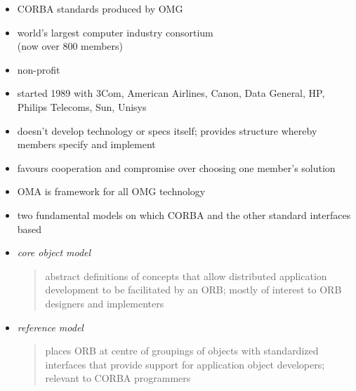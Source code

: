 \documentclass{sepslide-soa-faked} %
\begin{document}
\begin{slide}
\begin{itemize}
\item CORBA standards produced by OMG
\item world's largest computer industry consortium \\
  (now over 800 members)
\item non-profit
\item started 1989 with 3Com, American Airlines, Canon, Data General, HP,
Philips Telecoms, Sun, Unisys
\item doesn't develop technology or specs itself; provides structure
whereby members specify and implement
\item favours cooperation and compromise over choosing one member's solution
\end{itemize}
\end{slide}

\begin{slide}
\begin{itemize}
\item OMA is framework for all OMG technology
\item two fundamental models on which CORBA and the other standard
interfaces based
\item \emph{core object model}
  \begin{quote}
  abstract definitions of concepts that allow distributed application
  development to be facilitated by an ORB; 
  mostly of interest to ORB designers and implementers
  \end{quote}
\item \emph{reference model}
  \begin{quote}
  places ORB at centre of groupings of objects with standardized interfaces
  that provide support for application object developers;
  relevant to CORBA programmers
  \end{quote}
\end{itemize}
\end{slide}
\end{document}

